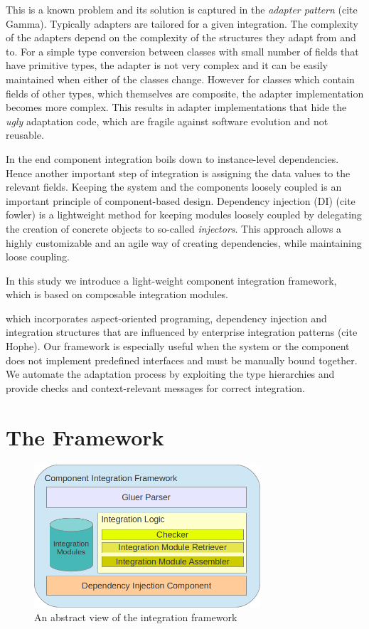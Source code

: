 \documentclass{llncs}
\begin{document}
This is a known problem and its solution is captured in the \emph{adapter pattern} (cite Gamma). 
Typically adapters are tailored for a given integration. 
The complexity of the adapters depend on the complexity of the structures they adapt from and to. 
For a simple type conversion between classes with small number of fields that have primitive types, the adapter is not very complex and it can be easily maintained when either of the classes change. 
However for classes which contain fields of other types, which themselves are composite, the adapter implementation becomes more complex.
This results in adapter implementations that hide the \emph{ugly} adaptation code, which are fragile against software evolution and not reusable. 

In the end component integration boils down to instance-level dependencies. 
Hence another important step of integration is assigning the data values to the relevant fields.  
Keeping the system and the components loosely coupled is an important principle of component-based design. 
Dependency injection (DI) (cite fowler) is a lightweight method for keeping modules loosely coupled by delegating the creation of concrete objects to so-called \emph{injectors}. This approach allows a highly customizable and an agile way of creating dependencies, while maintaining loose coupling.

In this study we introduce a light-weight component integration framework, which is based on composable integration modules. 



which incorporates aspect-oriented programing, dependency injection and integration structures that are influenced by enterprise integration patterns (cite Hophe). 
Our framework is especially useful when the system or the component does not implement predefined interfaces and must be manually bound together. 
We automate the adaptation process by exploiting the type hierarchies and provide checks and context-relevant messages for correct integration.


\section{The Framework}

\begin{figure}
\includegraphics[width=0.75\textwidth]{images/integrationframework.png}
\caption{An abstract view of the integration framework}
\label{fig:main}
\end{figure}
\end{document}
